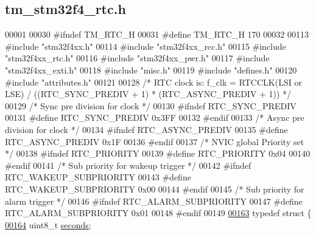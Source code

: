 \hypertarget{tm__stm32f4__rtc_8h_source}{}\subsection{tm\+\_\+stm32f4\+\_\+rtc.\+h}

\begin{DoxyCode}
00001 
00030 \textcolor{preprocessor}{#ifndef TM\_RTC\_H}
00031 \textcolor{preprocessor}{#define TM\_RTC\_H 170}
00032 
00113 \textcolor{preprocessor}{#include "stm32f4xx.h"}
00114 \textcolor{preprocessor}{#include "stm32f4xx\_rcc.h"}
00115 \textcolor{preprocessor}{#include "stm32f4xx\_rtc.h"}
00116 \textcolor{preprocessor}{#include "stm32f4xx\_pwr.h"}
00117 \textcolor{preprocessor}{#include "stm32f4xx\_exti.h"}
00118 \textcolor{preprocessor}{#include "misc.h"}
00119 \textcolor{preprocessor}{#include "defines.h"}
00120 \textcolor{preprocessor}{#include "attributes.h"}
00121 
00128 \textcolor{comment}{/* RTC clock is: f\_clk = RTCCLK(LSI or LSE) / ((RTC\_SYNC\_PREDIV + 1) * (RTC\_ASYNC\_PREDIV + 1)) */}
00129 \textcolor{comment}{/* Sync pre division for clock */}
00130 \textcolor{preprocessor}{#ifndef RTC\_SYNC\_PREDIV}
00131 \textcolor{preprocessor}{#define RTC\_SYNC\_PREDIV                 0x3FF}
00132 \textcolor{preprocessor}{#endif}
00133 \textcolor{comment}{/* Async pre division for clock */}
00134 \textcolor{preprocessor}{#ifndef RTC\_ASYNC\_PREDIV}
00135 \textcolor{preprocessor}{#define RTC\_ASYNC\_PREDIV                0x1F}
00136 \textcolor{preprocessor}{#endif}
00137 \textcolor{comment}{/* NVIC global Priority set */}
00138 \textcolor{preprocessor}{#ifndef RTC\_PRIORITY}
00139 \textcolor{preprocessor}{#define RTC\_PRIORITY                    0x04}
00140 \textcolor{preprocessor}{#endif}
00141 \textcolor{comment}{/* Sub priority for wakeup trigger */}
00142 \textcolor{preprocessor}{#ifndef RTC\_WAKEUP\_SUBPRIORITY}
00143 \textcolor{preprocessor}{#define RTC\_WAKEUP\_SUBPRIORITY          0x00}
00144 \textcolor{preprocessor}{#endif}
00145 \textcolor{comment}{/* Sub priority for alarm trigger */}
00146 \textcolor{preprocessor}{#ifndef RTC\_ALARM\_SUBPRIORITY}
00147 \textcolor{preprocessor}{#define RTC\_ALARM\_SUBPRIORITY           0x01}
00148 \textcolor{preprocessor}{#endif}
00149 
\hypertarget{tm__stm32f4__rtc_8h_source_l00163}{}\hyperlink{struct_t_m___r_t_c__t}{00163} \textcolor{keyword}{typedef} \textcolor{keyword}{struct }\{
\hypertarget{tm__stm32f4__rtc_8h_source_l00164}{}\hyperlink{struct_t_m___r_t_c__t_a46729a903be1a03cdb248fb48d84d4f5}{00164}     uint8\_t \hyperlink{struct_t_m___r_t_c__t_a46729a903be1a03cdb248fb48d84d4f5}{seconds};     

\end{DoxyCode}

